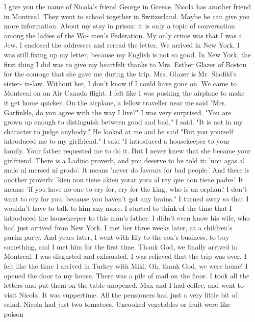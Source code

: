 I 
give you the name of Nicola's friend George in Greece.
Nicola has another friend in Montreal.
They went to 
school together in Switzerland.
Maybe he can give you 
more information.
About my stay in prison: it is only 
a topic of conversation among the ladies of the Wo-
men's Federation.
My only crime was that I was a Jew.
I enclosed the addresses and reread the letter.
We arrived in New York.
I was still fixing up my letter, because 
my English is not so good.
In New York, the first thing I did was to 
give my heartfelt thanks to Mrs.
Esther Glazer of Boston for the courage 
that she gave me during the trip.
Mrs.
Glazer is Mr.
Shofild's sister-
in-law.
Without her, I don't know if I could have gone on.
We came to Montreal on an Air Canada flight.
I felt like I was 
pushing the airplane to make it get home quicker.
On the airplane, 
a fellow traveller near me said "Mrs.
Garfinkle, do you agree with 
the way I live?"
I was very surprised.
"You are grown up enough to distinguish between good and bad," 
I said.
"It is not in my character to judge anybody."
He looked at me and he said "But you yourself introduced me to 
my girlfriend."
I said "I introduced a housekeeper to your family.
Your father 
requested me to do it.
But I never knew that she became your girlfriend.
There is a Ladino proverb, and you deserve to be told it: 
'non agas al malo ni mersed ni grado'.
It means 'never do favours 
for bad people.'
And there is another proverb: 'kien non tiene 
akien yorar yora al rey que non tiene padre'.
It means: 'if you 
have no-one to cry for, cry for the king, who is an orphan.'
I don't 
want to cry for you, because you haven't got any brains."
I turned 
away so that I wouldn't have to talk to him any more.
I started to 
think of the time that I introduced the housekeeper to this man's 
father.
I didn't even know his wife, who had just arrived from New 
York.
I met her three weeks later, at a children's purim party.
And 
years later, I went with Ely to the son's business, to buy something, 
and I met him for the first time.
Thank God, we finally arrived in Montreal.
I was disgusted and 
exhausted.
I was relieved that the trip was over.
I felt like the 
time I arrived in Turkey with Miki.
Oh, thank God, we were home!
I opened the door to my house.
There was a pile of mail on 
the floor.
I took all the letters and put them on the table unopened.
Max and I had coffee, and went to visit Nicola.
It was suppertime.
All the pensioners had just a very little bit of salad.
Nicola had 
just two tomatoes.
Uncooked vegetables or fruit were like poison